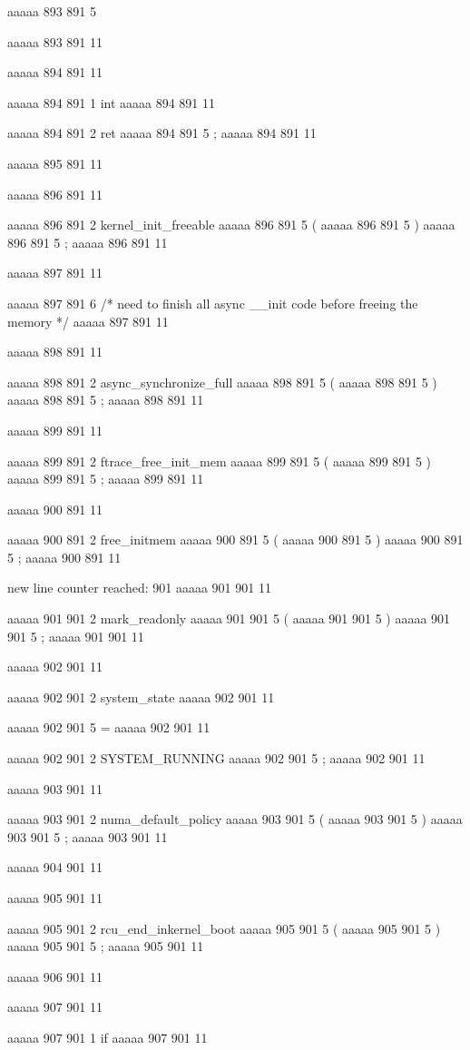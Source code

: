 aaaaa 893 891
5
{
aaaaa 893 891
11


aaaaa 894 891
11
	
aaaaa 894 891
1
int
aaaaa 894 891
11
 
aaaaa 894 891
2
ret
aaaaa 894 891
5
;
aaaaa 894 891
11


aaaaa 895 891
11


aaaaa 896 891
11
	
aaaaa 896 891
2
kernel_init_freeable
aaaaa 896 891
5
(
aaaaa 896 891
5
)
aaaaa 896 891
5
;
aaaaa 896 891
11


aaaaa 897 891
11
	
aaaaa 897 891
6
/* need to finish all async __init code before freeing the memory */
aaaaa 897 891
11


aaaaa 898 891
11
	
aaaaa 898 891
2
async_synchronize_full
aaaaa 898 891
5
(
aaaaa 898 891
5
)
aaaaa 898 891
5
;
aaaaa 898 891
11


aaaaa 899 891
11
	
aaaaa 899 891
2
ftrace_free_init_mem
aaaaa 899 891
5
(
aaaaa 899 891
5
)
aaaaa 899 891
5
;
aaaaa 899 891
11


aaaaa 900 891
11
	
aaaaa 900 891
2
free_initmem
aaaaa 900 891
5
(
aaaaa 900 891
5
)
aaaaa 900 891
5
;
aaaaa 900 891
11


new line counter reached: 901
aaaaa 901 901
11
	
aaaaa 901 901
2
mark_readonly
aaaaa 901 901
5
(
aaaaa 901 901
5
)
aaaaa 901 901
5
;
aaaaa 901 901
11


aaaaa 902 901
11
	
aaaaa 902 901
2
system_state
aaaaa 902 901
11
 
aaaaa 902 901
5
=
aaaaa 902 901
11
 
aaaaa 902 901
2
SYSTEM_RUNNING
aaaaa 902 901
5
;
aaaaa 902 901
11


aaaaa 903 901
11
	
aaaaa 903 901
2
numa_default_policy
aaaaa 903 901
5
(
aaaaa 903 901
5
)
aaaaa 903 901
5
;
aaaaa 903 901
11


aaaaa 904 901
11


aaaaa 905 901
11
	
aaaaa 905 901
2
rcu_end_inkernel_boot
aaaaa 905 901
5
(
aaaaa 905 901
5
)
aaaaa 905 901
5
;
aaaaa 905 901
11


aaaaa 906 901
11


aaaaa 907 901
11
	
aaaaa 907 901
1
if
aaaaa 907 901
11
 
}
